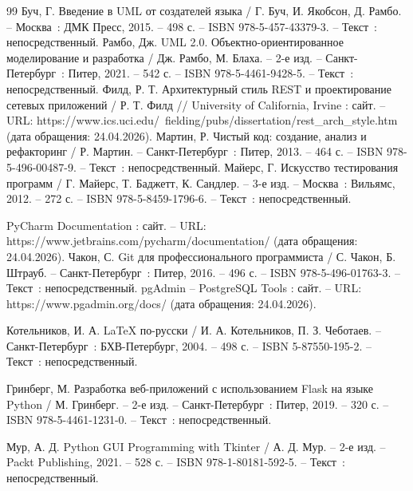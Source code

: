 \begin{thebibliography}{99}
	 Буч, Г. Введение в UML от создателей языка / Г. Буч, И. Якобсон, Д. Рамбо. -- Москва~: ДМК Пресс, 2015. -- 498 с. -- ISBN 978-5-457-43379-3. -- Текст~: непосредственный.
	 Рамбо, Дж. UML 2.0. Объектно-ориентированное моделирование и разработка / Дж. Рамбо, М. Блаха. -- 2-е изд. -- Санкт-Петербург~: Питер, 2021. -- 542 с. -- ISBN 978-5-4461-9428-5. -- Текст~: непосредственный.
	 Филд, Р. Т. Архитектурный стиль REST и проектирование сетевых приложений / Р. Т. Филд // University of California, Irvine : сайт. -- URL: https://www.ics.uci.edu/~fielding/pubs/dissertation/rest\_arch\_style.htm (дата обращения: 24.04.2026). 
	 Мартин, Р. Чистый код: создание, анализ и рефакторинг / Р. Мартин. -- Санкт-Петербург~: Питер, 2013. -- 464 с. -- ISBN 978-5-496-00487-9. -- Текст~: непосредственный.
	 Майерс, Г. Искусство тестирования программ / Г. Майерс, Т. Баджетт, К. Сандлер. -- 3-е изд. -- Москва~: Вильямс, 2012. -- 272 с. -- ISBN 978-5-8459-1796-6. -- Текст~: непосредственный.
	
	 PyCharm Documentation : сайт. -- URL: https://www.jetbrains.com/pycharm/documentation/ (дата обращения: 24.04.2026). 
	 Чакон, С. Git для профессионального программиста / С. Чакон, Б. Штрауб. -- Санкт-Петербург~: Питер, 2016. -- 496 с. -- ISBN 978-5-496-01763-3. -- Текст~: непосредственный.
	 pgAdmin -- PostgreSQL Tools : сайт. -- URL: https://www.pgadmin.org/docs/ (дата обращения: 24.04.2026). 
	
	 Котельников, И. А. LaTeX по-русски / И. А. Котельников, П. З. Чеботаев. -- Санкт-Петербург~: БХВ-Петербург, 2004. -- 498 с. -- ISBN 5-87550-195-2. -- Текст~: непосредственный.
	
	
	 Гринберг, М. Разработка веб-приложений с использованием Flask на языке Python / М. Гринберг. -- 2-е изд. -- Санкт-Петербург~: Питер, 2019. -- 320 с. -- ISBN 978-5-4461-1231-0. -- Текст~: непосредственный.
	
	 Мур, А. Д. Python GUI Programming with Tkinter / А. Д. Мур. -- 2-е изд. -- Packt Publishing, 2021. -- 528 с. -- ISBN 978-1-80181-592-5. -- Текст~: непосредственный.
	

\end{thebibliography}
